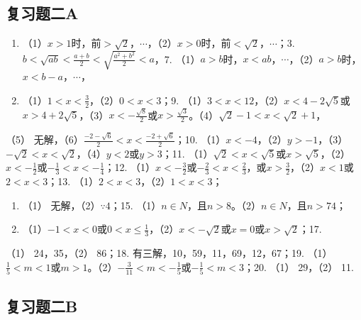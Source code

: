 \subsection{复习题二A}

\begin{enumerate}[start=2]
\item
  （1）\(x > 1\)时，前\(> \sqrt{2}\)，\(\cdots\)，（2）\(x > 0\)时，前\(< \sqrt{2}\)，\(\cdots\)；3.\(b < \sqrt{ab} < \frac{a + b}{2} < \sqrt{\frac{a^2 + b^2}{2}} < a\)，7.
  （1）\(a > b\)时，\(x < ab\)，\(\cdots\)，（2）\(a > b\)时，\(x < b - a\)，\(\cdots\)，
\item
  （1）\(1 < x < \frac{3}{2}\)，（2）\(0 < x < 3\)；9.
  （1）\(3 < x < 12\)，（2）\(x < 4 - 2\sqrt{5}\)或\(x > 4 + 2\sqrt{5}\)，（3）\(x < -\frac{\sqrt{8}}{2}\)或\(x > \frac{\sqrt{3}}{2}\)。（4）\(\sqrt{2} - 1 < x < \sqrt{2} + 1\)，
\end{enumerate}

（5）
无解，（6）\(\frac{-2 - \sqrt{6}}{2} < x < \frac{-2 + \sqrt{6}}{2}\)；10.
（1）\(x < -4\)，（2）\(y > -1\)，（3）\(-\sqrt{2} < x < \sqrt{2}\)，（4）\(y < 2\)或\(y > 3\)；11.
（1）\(\sqrt{2} < x < \sqrt{5}\)或\(x > \sqrt{5}\)，（2）\(x < -\frac{1}{2}\)或\(-\frac{1}{3} < x < -\frac{1}{4}\)；12.
（1）\(x < -\frac{3}{2}\)或\(-\frac{2}{3} < x < \frac{2}{3}\)，或\(x > \frac{3}{2}\)，（2）\(x < 1\)或\(2 < x < 3\)；13.
（1）\(2 < x < 3\)，（2）\(1 < x < 3\)；

\begin{enumerate}[start=14]
\item
  （1） 无解，（2）\(\because 4\)；15.
  （1）\(n \in N\)，且\(n > 8\)。（2）\(n \in N\)，且\(n > 74\)；
\item
  （1）\(-1 < x < 0\)或\(0 < x \leqslant \frac{1}{3}\)，（2）\(x < -\sqrt{2}\)或\(x = 0\)或\(x > \sqrt{2}\)；17.
\end{enumerate}

（1） 24，35，（2） 86；18. 有三解，10，59，11，69，12，67；19.
（1）\(\frac{1}{5} < m < 1\)或\(m > 1\)。（2）\(-\frac{3}{11} < m < -\frac{1}{5}\)或\(-\frac{1}{5} < m < 3\)；20.
（1） 29，（2） 11.

\subsection{复习题二B}

